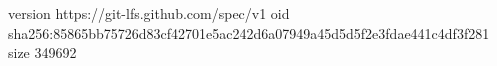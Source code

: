 version https://git-lfs.github.com/spec/v1
oid sha256:85865bb75726d83cf42701e5ac242d6a07949a45d5d5f2e3fdae441c4df3f281
size 349692
